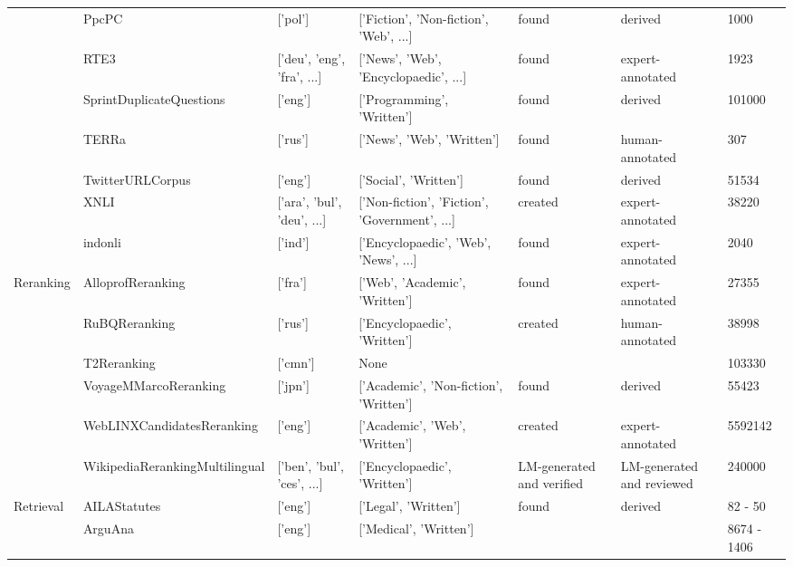 \begin{table*}[!htb]
{\begin{tabular}{lllllll}
     & PpcPC \cite{dadas2022training} & ['pol'] & ['Fiction', 'Non-fiction', 'Web', ...] & found & derived & 1000 \\
     & RTE3 \cite{giampiccolo-etal-2007-third} & ['deu', 'eng', 'fra', ...] & ['News', 'Web', 'Encyclopaedic', ...] & found & expert-annotated & 1923 \\
     & SprintDuplicateQuestions \cite{shah-etal-2018-adversarial} & ['eng'] & ['Programming', 'Written'] & found & derived & 101000 \\
     & TERRa \cite{shavrina2020russiansuperglue} & ['rus'] & ['News', 'Web', 'Written'] & found & human-annotated & 307 \\
     & TwitterURLCorpus \cite{lan-etal-2017-continuously} & ['eng'] & ['Social', 'Written'] & found & derived & 51534 \\
     & XNLI \cite{conneau2018xnli} & ['ara', 'bul', 'deu', ...] & ['Non-fiction', 'Fiction', 'Government', ...] & created & expert-annotated & 38220 \\
     & indonli \cite{mahendra-etal-2021-indonli} & ['ind'] & ['Encyclopaedic', 'Web', 'News', ...] & found & expert-annotated & 2040 \\
    \cline{1-7}
    \multirow[t]{6}{*}{Reranking} & AlloprofReranking \cite{lef23} & ['fra'] & ['Web', 'Academic', 'Written'] & found & expert-annotated & 27355 \\
     & RuBQReranking \cite{RuBQ2021} & ['rus'] & ['Encyclopaedic', 'Written'] & created & human-annotated & 38998 \\
     & T2Reranking \cite{xie2023t2ranking} & ['cmn'] & None & & & 103330 \\
     & VoyageMMarcoReranking \cite{clavié2023jacolbert} & ['jpn'] & ['Academic', 'Non-fiction', 'Written'] & found & derived & 55423 \\
     & WebLINXCandidatesReranking \cite{lù2024weblinx} & ['eng'] & ['Academic', 'Web', 'Written'] & created & expert-annotated & 5592142 \\
     & WikipediaRerankingMultilingual \cite{wikidump} & ['ben', 'bul', 'ces', ...] & ['Encyclopaedic', 'Written'] & LM-generated and verified & LM-generated and reviewed & 240000 \\
    \cline{1-7}
    \multirow[t]{19}{*}{Retrieval} & AILAStatutes \cite{paheli_bhattacharya_2020_4063986} & ['eng'] & ['Legal', 'Written'] & found & derived & 82 - 50 \\
     & ArguAna \cite{boteva2016} & ['eng'] & ['Medical', 'Written'] & & & 8674 - 1406 \\

\end{tabular}}
\end{table*}
